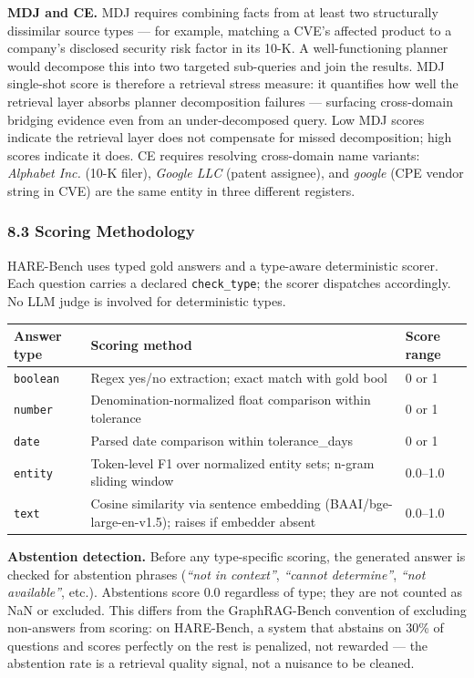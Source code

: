 \textbf{MDJ and CE.} MDJ requires combining facts from at least two structurally dissimilar source types --- for example, matching a CVE's affected product to a company's disclosed security risk factor in its 10-K. A well-functioning planner would decompose this into two targeted sub-queries and join the results. MDJ single-shot score is therefore a retrieval stress measure: it quantifies how well the retrieval layer absorbs planner decomposition failures --- surfacing cross-domain bridging evidence even from an under-decomposed query. Low MDJ scores indicate the retrieval layer does not compensate for missed decomposition; high scores indicate it does. CE requires resolving cross-domain name variants: \emph{Alphabet Inc.} (10-K filer), \emph{Google LLC} (patent assignee), and \emph{google} (CPE vendor string in CVE) are the same entity in three different registers.

\subsubsection{8.3 Scoring Methodology}\label{scoring-methodology}

HARE-Bench uses typed gold answers and a type-aware deterministic scorer. Each question carries a declared \texttt{check\_type}; the scorer dispatches accordingly. No LLM judge is involved for deterministic types.

\begin{small}
\setlength{\tabcolsep}{4pt}
\begin{longtable}{p{0.8in}p{4.0in}p{1.0in}}
\toprule
\textbf{Answer type} & \textbf{Scoring method} & \textbf{Score range} \\
\midrule
\endhead
\texttt{boolean} & Regex yes/no extraction; exact match with gold bool & 0 or 1 \\
\texttt{number} & Denomination-normalized float comparison within tolerance & 0 or 1 \\
\texttt{date} & Parsed date comparison within tolerance\_days & 0 or 1 \\
\texttt{entity} & Token-level F1 over normalized entity sets; n-gram sliding window & 0.0--1.0 \\
\texttt{text} & Cosine similarity via sentence embedding (BAAI/bge-large-en-v1.5); raises if embedder absent & 0.0--1.0 \\
\bottomrule
\end{longtable}
\end{small}

\textbf{Abstention detection.} Before any type-specific scoring, the generated answer is checked for abstention phrases (\emph{``not in context''}, \emph{``cannot determine''}, \emph{``not available''}, etc.). Abstentions score 0.0 regardless of type; they are not counted as NaN or excluded. This differs from the GraphRAG-Bench convention of excluding non-answers from scoring: on HARE-Bench, a system that abstains on 30\% of questions and scores perfectly on the rest is penalized, not rewarded --- the abstention rate is a retrieval quality signal, not a nuisance to be cleaned.

